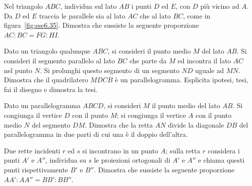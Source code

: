 \begin{multicols}{2}

\begin{esercizio}
\label{ese:6.35}
Nel triangolo \(ABC\), individua sul lato \(AB\) i punti \(D\) ed \(E\), con 
\(D\) più vicino ad \(A\). Da \(D\) ed \(E\) traccia le parallele sia al lato 
\(AC\) che al lato \(BC\), come in figura~\ref{fig:ese6.35}. Dimostra che 
sussiste la seguente proporzione \(AC:BC=FG:HI\).
\end{esercizio}
\begin{inaccessibleblock}
\begin{center}
\scalebox{.8}{}
\end{center}
\end{inaccessibleblock}

\begin{esercizio}
\label{ese:6.36}
Dato un triangolo qualunque \(ABC\), si consideri il punto medio \(M\) 
del lato \(AB\). Si consideri il segmento parallelo al lato \(BC\) che 
parte da \(M\) ed incontra il lato \(AC\) nel punto \(N\). Si prolunghi 
questo segmento di un segmento \(ND\) uguale ad \(MN\). Dimostra che il 
quadrilatero \(MDCB\) è un parallelogramma. Esplicita ipotesi, tesi, 
fai il disegno e dimostra la tesi.
\end{esercizio}

\begin{esercizio}
\label{ese:6.37}
Dato un parallelogramma \(ABCD\), si consideri \(M\) il punto medio del 
lato \(AB\). Si congiunga il vertice \(D\) con il punto \(M\); si congiunga 
il vertice \(A\) con il punto medio \(N\) del segmento \(DM\). Dimostra che 
la retta \(AN\) divide la diagonale \(DB\) del parallelogramma in due 
parti di cui una è il doppio dell'altra.
\end{esercizio}

\begin{esercizio}
\label{ese:6.38}
Due rette incidenti \(r\) ed \(s\) si incontrano in un punto \(A\); sulla 
retta \(r\) considera i punti \(A'\) e \(A''\), individua su \(s\) le 
proiezioni ortogonali di \(A'\) e \(A''\) e chiama questi punti 
rispettivamente \(B'\) e \(B''\). Dimostra che sussiste la seguente 
proporzione \(AA' : AA'' = BB' : BB''\).
\end{esercizio}


\end{multicols}
